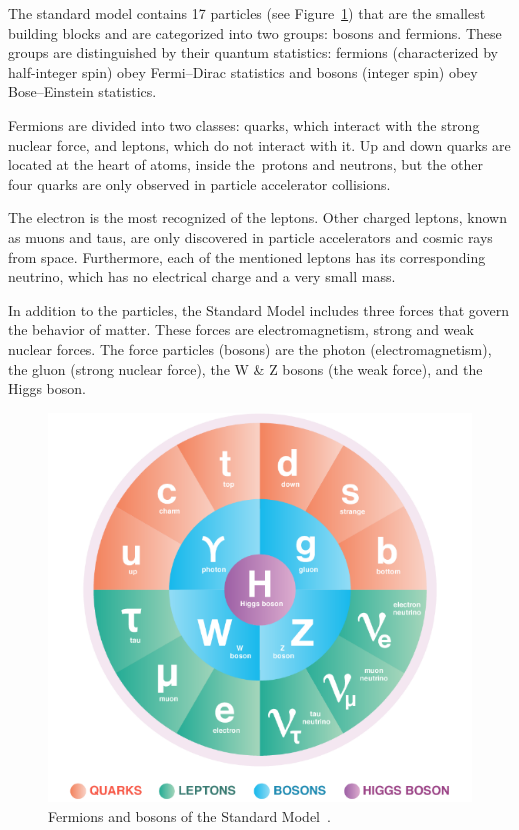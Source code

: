 The standard model contains 17 particles (see Figure~\ref{fig_standard})  that are the smallest building blocks and are categorized into two groups: bosons and fermions. These groups are distinguished by their quantum statistics: fermions (characterized by half-integer spin) obey Fermi–Dirac statistics and bosons (integer spin) obey Bose–Einstein statistics. 

Fermions are divided into two classes: quarks, which interact with the strong nuclear force, and leptons, which do not interact with it. Up and down quarks are located at the heart of atoms, inside the protons and neutrons, but the other four quarks are only observed in particle accelerator collisions.

The electron is the most recognized of the leptons. Other charged leptons, known as muons and taus, are only discovered in particle accelerators and cosmic rays from space. Furthermore, each of the mentioned leptons has its corresponding neutrino, which has no electrical charge and a very small mass.

In addition to the particles, the Standard Model includes three forces that govern the behavior of matter. These forces are electromagnetism, strong and weak nuclear forces. The force particles (bosons) are the photon (electromagnetism), the gluon (strong nuclear force), the W \& Z bosons (the weak force), and the Higgs boson.

\begin{figure}[!h]
\centering
\includegraphics[width=0.7\columnwidth]{Chapter1/images/particles.png}
\caption{Fermions and bosons of the Standard Model~\cite{standard_model}.}
\label{fig_standard}
\end{figure}


